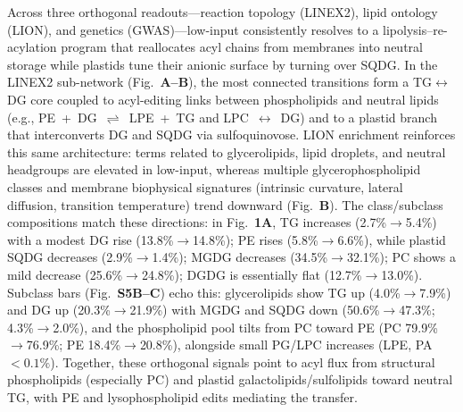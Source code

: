 \documentclass[10pt,letterpaper]{article}
\begin{document}
Across three orthogonal readouts—reaction topology (LINEX2), lipid ontology (LION), and genetics (GWAS)—low-input consistently resolves to a lipolysis–re-acylation program that reallocates acyl chains from membranes into neutral storage while plastids tune their anionic surface by turning over SQDG. In the LINEX2 sub-network (Fig.\ \textbf{A–B}), the most connected transitions form a TG$\leftrightarrow$DG core coupled to acyl-editing links between phospholipids and neutral lipids (e.g., \mbox{PE + DG $\rightleftharpoons$ LPE + TG} and \mbox{LPC $\leftrightarrow$ DG}) and to a plastid branch that interconverts DG and SQDG via sulfoquinovose. LION enrichment reinforces this same architecture: terms related to glycerolipids, lipid droplets, and neutral headgroups are elevated in low-input, whereas multiple glycerophospholipid classes and membrane biophysical signatures (intrinsic curvature, lateral diffusion, transition temperature) trend downward (Fig.\ \textbf{B}). The class/subclass compositions match these directions: in Fig.\ \textbf{1A}, TG increases (2.7\%$\rightarrow$5.4\%) with a modest DG rise (13.8\%$\rightarrow$14.8\%); PE rises (5.8\%$\rightarrow$6.6\%), while plastid SQDG decreases (2.9\%$\rightarrow$1.4\%); MGDG decreases (34.5\%$\rightarrow$32.1\%); PC shows a mild decrease (25.6\%$\rightarrow$24.8\%); DGDG is essentially flat (12.7\%$\rightarrow$13.0\%). Subclass bars (Fig.\ \textbf{S5B–C}) echo this: glycerolipids show TG up (4.0\%$\rightarrow$7.9\%) and DG up (20.3\%$\rightarrow$21.9\%) with MGDG and SQDG down (50.6\%$\rightarrow$47.3\%; 4.3\%$\rightarrow$2.0\%), and the phospholipid pool tilts from PC toward PE (PC 79.9\%$\rightarrow$76.9\%; PE 18.4\%$\rightarrow$20.8\%), alongside small PG/LPC increases (LPE, PA $<0.1\%$). Together, these orthogonal signals point to acyl flux from structural phospholipids (especially PC) and plastid galactolipids/sulfolipids toward neutral TG, with PE and lysophospholipid edits mediating the transfer.
\end{document}
